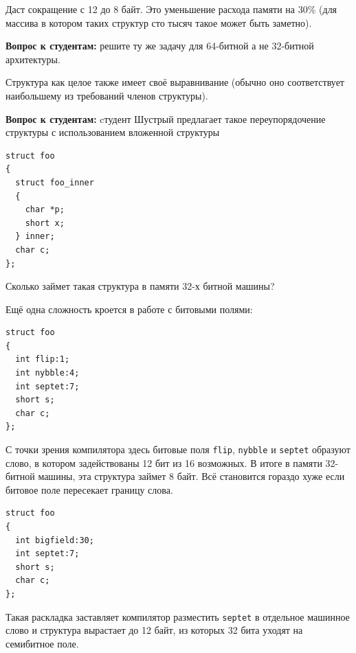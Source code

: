\documentclass[a4paper,12pt,oneside]{article}
\newif\ifanswers
\begin{document}
\ifanswers
Правильный ответ: переупаковка в нисходящем порядке

\begin{lstlisting}
struct foo 
{
  char *p;
  short x;
  char c;
};
\end{lstlisting}
\fi

Даст сокращение с 12 до 8 байт. Это уменьшение расхода памяти на 30\% (для массива в котором таких структур сто тысяч такое может быть заметно).

\textbf{Вопрос к студентам:} решите ту же задачу для 64-битной а не 32-битной архитектуры.

\ifanswers
Правильный ответ: теперь указатель будет 8 байт и скоращение с 24 до 16 -- те же 30\%
\fi

Структура как целое также имеет своё выравнивание (обычно оно соответствует наибольшему из требований членов структуры).

\textbf{Вопрос к студентам:} cтудент Шустрый предлагает такое переупорядочение структуры с использованием вложенной структуры

\begin{lstlisting}
struct foo 
{
  struct foo_inner 
  {
    char *p;
    short x;
  } inner;
  char c;
};
\end{lstlisting}

Сколько займет такая структура в памяти 32-х битной машины?

\ifanswers
Ответ: 4+2+2(выравнивание внутренней структуры)+1+7(выравнивание внешней структуры) -- это целых 16 байт. Немыслимо много. Поэтому с вложенными структурами надо быть осторожней.
\fi

Ещё одна сложность кроется в работе с битовыми полями:

\begin{lstlisting}
struct foo 
{
  int flip:1;
  int nybble:4;
  int septet:7;
  short s;
  char c;
};
\end{lstlisting}

С точки зрения компилятора здесь битовые поля \lstinline!flip!, \lstinline!nybble! и \lstinline!septet! образуют слово, в котором задействованы 12 бит из 16 возможных. В итоге в памяти 32-битной машины, эта структура займет 8 байт. Всё становится гораздо хуже если битовое поле пересекает границу слова.

\begin{lstlisting}
struct foo 
{
  int bigfield:30;
  int septet:7;
  short s;
  char c;
};
\end{lstlisting}

Такая раскладка заставляет компилятор разместить \lstinline!septet! в отдельное машинное слово и структура вырастает до 12 байт, из которых 32 бита уходят на семибитное поле.
\end{document}
